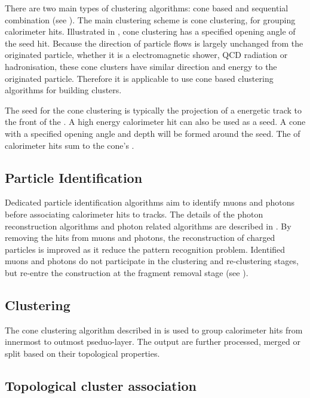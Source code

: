 There are two main types of clustering algorithms: cone based and sequential combination (see \Section{}). The main clustering scheme \pandora is cone clustering, for grouping calorimeter hits. Illustrated in , cone clustering has a specified opening angle of the seed hit. Because the direction of particle flows is largely unchanged from the originated particle, whether it is a electromagnetic shower, QCD radiation or hadronisation, these cone clusters have similar direction and energy to the originated particle. Therefore it is applicable to use cone based clustering algorithms for building clusters.

The seed for the cone clustering is typically the projection of a energetic track to the front of the \ECAL. A high  energy calorimeter hit can also be used as a seed. A cone with a specified opening angle and depth will be formed around the seed. The \fourMomentum of calorimeter hits sum to the cone's \fourMomentum.


\subsection{Particle Identification}
\label{sec:particleID}

Dedicated particle identification algorithms aim to identify muons and photons before associating calorimeter hits to tracks. The details of the photon reconstruction algorithms and photon related algorithms are described in . By removing the hits from muons and photons, the reconstruction of charged particles is improved as it reduce the pattern recognition problem. Identified muons and photons do not participate in the clustering and re-clustering stages, but re-entre the construction at the fragment removal stage (see ). 

\subsection{Clustering}

The cone clustering algorithm described in  is used to group calorimeter hits from innermost to outmost pseduo-layer. The output \clusters are further processed, merged or split based on their topological properties. 

\subsection{Topological cluster association}

